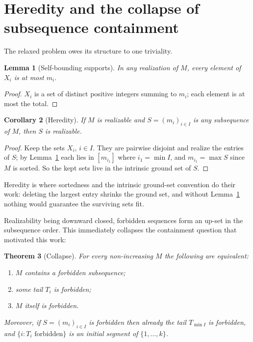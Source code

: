 \documentclass[11pt]{article}
\newtheorem{theorem}{Theorem}[section]
\newtheorem{lemma}[theorem]{Lemma}
\newtheorem{corollary}[theorem]{Corollary}
\theoremstyle{definition}
\theoremstyle{remark}
\newcommand{\intv}[1]{[#1]}
\begin{document}
\section{Heredity and the collapse of subsequence containment}\label{sec:heredity}

The relaxed problem owes its structure to one triviality.

\begin{lemma}[Self-bounding supports]\label{lem:selfbound}
In any realization of $M$, every element of $X_i$ is at most $m_i$.
\end{lemma}

\begin{proof}
$X_i$ is a set of distinct positive integers summing to $m_i$; each element is at
most the total.
\end{proof}

\begin{corollary}[Heredity]\label{cor:heredity}
If $M$ is realizable and $S=(m_i)_{i\in I}$ is any subsequence of $M$, then $S$ is
realizable.
\end{corollary}

\begin{proof}
Keep the sets $X_i$, $i\in I$. They are pairwise disjoint and realize the entries of
$S$; by Lemma~\ref{lem:selfbound} each lies in $\intv{m_{i_1}}$ where $i_1=\min I$,
and $m_{i_1}=\max S$ since $M$ is sorted. So the kept sets live in the intrinsic
ground set of $S$.
\end{proof}

Heredity is where sortedness and the intrinsic ground-set convention do their work:
deleting the largest entry shrinks the ground set, and without
Lemma~\ref{lem:selfbound} nothing would guarantee the surviving sets fit.

Realizability being downward closed, forbidden sequences form an up-set in the
subsequence order. This immediately collapses the containment question that motivated
this work:

\begin{theorem}[Collapse]\label{thm:collapse}
For every non-increasing $M$ the following are equivalent:
\begin{enumerate}[label=(\alph*),itemsep=1pt]
\item $M$ contains a forbidden subsequence;
\item some tail $T_i$ is forbidden;
\item $M$ itself is forbidden.
\end{enumerate}
Moreover, if $S=(m_i)_{i\in I}$ is forbidden then already the tail $T_{\min I}$ is
forbidden, and $\{i: T_i \text{ forbidden}\}$ is an initial segment of
$\{1,\dots,k\}$.
\end{theorem}
\end{document}
